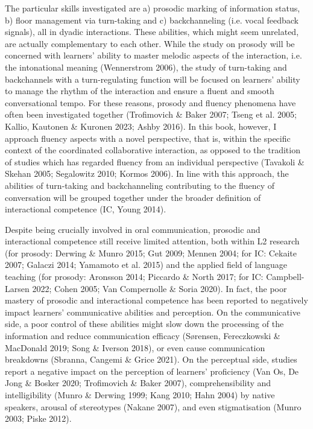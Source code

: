 \begin{styleStandard}
The particular skills investigated are a) prosodic marking of information status, b) floor management via turn-taking and c) backchanneling (i.e. vocal feedback signals), all in dyadic interactions. These abilities, which might seem unrelated, are actually complementary to each other. While the study on prosody will be concerned with learners’ ability to master melodic aspects of the interaction, i.e. the intonational meaning (Wennerstrom 2006), the study of turn-taking and backchannels with a turn-regulating function will be focused on learners’ ability to manage the rhythm of the interaction and ensure a fluent and smooth conversational tempo. For these reasons, prosody and fluency phenomena have often been investigated together (Trofimovich \& Baker 2007; Tseng et al. 2005; Kallio, Kautonen \& Kuronen 2023; Ashby 2016). In this book, however, I approach fluency aspects with a novel perspective, that is, within the specific context of the coordinated collaborative interaction, as opposed to the tradition of studies which has regarded fluency from an individual perspective (Tavakoli \& Skehan 2005; Segalowitz 2010; Kormos 2006). In line with this approach, the abilities of turn-taking and backchanneling contributing to the fluency of conversation will be grouped together under the broader definition of interactional competence (IC, Young 2014).
\end{styleStandard}

\begin{styleStandard}
Despite being crucially involved in oral communication, prosodic and interactional competence still receive limited attention, both within L2 research (for prosody: Derwing \& Munro 2015; Gut 2009; Mennen 2004; for IC: Cekaite 2007; Galaczi 2014; Yamamoto et al. 2015) and the applied field of language teaching (for prosody: Aronsson 2014; Piccardo \& North 2017; for IC: Campbell-Larsen 2022; Cohen 2005; Van Compernolle \& Soria 2020). In fact, the poor mastery of prosodic and interactional competence has been reported to negatively impact learners’ communicative abilities and perception. On the communicative side, a poor control of these abilities might slow down the processing of the information and reduce communication efficacy (Sørensen, Fereczkowski \& MacDonald 2019; Song \& Iverson 2018), or even cause communication breakdowns (Sbranna, Cangemi \& Grice 2021). On the perceptual side, studies report a negative impact on the perception of learners’ proficiency (Van Os, De Jong \& Bosker 2020; Trofimovich \& Baker 2007), comprehensibility and intelligibility (Munro \& Derwing 1999; Kang 2010; Hahn 2004) by native speakers, arousal of stereotypes (Nakane 2007), and even stigmatisation (Munro 2003; Piske 2012).
\end{styleStandard}


